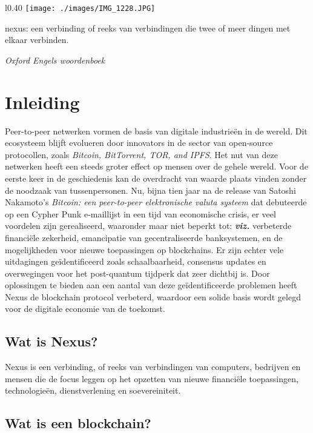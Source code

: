 \documentclass[11pt]{article}
\begin{document}
\begin{wrapfigure}[4]{l}{0.40\textwidth}
    \centering
    \vspace{-25pt}
    \hspace{-15pt}
    \texttt{[image: ./images/IMG\_1228.JPG]}
\end{wrapfigure}

\epigraph{nexus: een verbinding of reeks van verbindingen die twee of meer dingen met elkaar verbinden.}{\textit{\footnotesize{Oxford Engels woordenboek}}}

\section{Inleiding}

Peer-to-peer netwerken vormen de basis van digitale industrieën in de wereld. Dit ecosysteem blijft evolueren door innovators in de sector van open-source protocollen, zoals \textit{Bitcoin, BitTorrent, TOR, and IPFS}.
Het nut van deze netwerken heeft een steeds groter effect op mensen over de gehele wereld. Voor de eerste keer in de geschiedenis kan de overdracht van waarde plaats vinden zonder de noodzaak van tussenpersonen.
Nu, bijna tien jaar na de release van Satoshi Nakamoto's \textit{Bitcoin: een peer-to-peer elektronische valuta systeem} \cite{bitcoin} dat debuteerde op een Cypher Punk e-maillijst in een tijd van economische crisis, er veel voordelen zijn gerealiseerd, waaronder maar niet beperkt tot: \textbf{\textit{viz.}} verbeterde financiële zekerheid, emancipatie van gecentraliseerde banksystemen, en de mogelijkheden voor nieuwe toepassingen op blockchains. Er zijn echter vele uitdagingen geïdentificeerd zoals schaalbaarheid, consensus updates en overwegingen voor het post-quantum tijdperk dat zeer dichtbij is. Door oplossingen te bieden aan een ​​aantal van deze geïdentificeerde problemen heeft Nexus de blockchain protocol verbeterd, waardoor een solide basis wordt gelegd voor de digitale economie van de toekomst. 
\bigskip

\subsection{Wat is Nexus?}
Nexus is een verbinding, of reeks van verbindingen van computers, bedrijven en mensen die de focus leggen op het opzetten van nieuwe financiële toepassingen, technologieën, dienstverlening en soevereiniteit.  

\subsection{Wat is een blockchain?}
\end{document}
